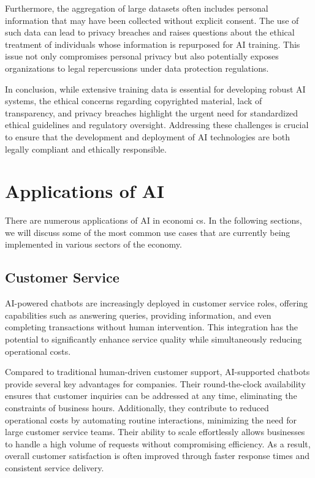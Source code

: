 Furthermore, the aggregation of large datasets often includes personal information that may have been collected without explicit consent. The use of such data can lead to privacy breaches and raises questions about the ethical treatment of individuals whose information is repurposed for AI training. This issue not only compromises personal privacy but also potentially exposes organizations to legal repercussions under data protection regulations.

In conclusion, while extensive training data is essential for developing robust AI systems, the ethical concerns regarding copyrighted material, lack of transparency, and privacy breaches highlight the urgent need for standardized ethical guidelines and regulatory oversight. Addressing these challenges is crucial to ensure that the development and deployment of AI technologies are both legally compliant and ethically responsible.



\section{Applications of AI }
\label{sec:applications-of-ai}

There are numerous applications of AI in economi    cs. In the following sections, we will discuss some of the most common use cases that are 
currently being implemented in various sectors of the economy.

\subsection{Customer Service}
\label{subsec:customer-service}

AI-powered chatbots are increasingly deployed in customer service roles, offering capabilities such as answering queries, providing information, and even completing transactions without human intervention. This integration has the potential to significantly enhance service quality while simultaneously reducing operational costs.  

Compared to traditional human-driven customer support, AI-supported chatbots provide several key advantages for companies. Their round-the-clock availability ensures that customer inquiries can be addressed at any time, eliminating the constraints of business hours. Additionally, they contribute to reduced operational costs by automating routine interactions, minimizing the need for large customer service teams. Their ability to scale effortlessly allows businesses to handle a high volume of requests without compromising efficiency. As a result, overall customer satisfaction is often improved through faster response times and consistent service delivery.  


